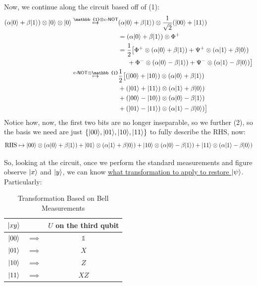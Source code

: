 \documentclass[12pt]{article}
\begin{document}
\noindent Now, we continue along the circuit based off of (1):
\begin{equation}
\begin{aligned}
(\alpha \Ket{0} + \beta \Ket{1})\otimes \Ket{0}\otimes \Ket{0}
    \overset{\mathbb{1}\otimes \text{c-}\NOT}{\mapsto}
    &(\alpha \Ket{0} + \beta \Ket{1})\otimes \frac{1}{\sqrt{2}}(\Ket{00} + \Ket{11})\\
    &=(\alpha \Ket{0} + \beta \Ket{1})\otimes \Phi^+\\
    &= \frac{1}{2}\big[\Phi^+\otimes(\alpha\Ket{0} + \beta\Ket{1}) + \Psi^+\otimes(\alpha\Ket{1} + \beta\Ket{0})\\
    &\hspace{.5cm}+ \Phi^-\otimes(\alpha\Ket{0} - \beta\Ket{1}) + \Psi^-\otimes(\alpha\Ket{1} - \beta\Ket{0})\big]\\
    \overset{\text{c-}\NOT\otimes \mathbb{1}}{\mapsto}
    &\frac{1}{2}\big[(\Ket{00} + \Ket{10})\otimes(\alpha\Ket{0} + \beta\Ket{1})\\
    &+ (\Ket{01} + \Ket{11})\otimes(\alpha\Ket{1} + \beta\Ket{0})\\
    &+ (\Ket{00} - \Ket{10})\otimes(\alpha\Ket{0} - \beta\Ket{1})\\
    &+ (\Ket{01} - \Ket{11})\otimes(\alpha\Ket{1} - \beta\Ket{0})\big]
\end{aligned}
\end{equation}
Notice how, now, the first two bits are no longer inseparable, so we further (2), so the basis we need are just $\{\Ket{00}, \Ket{01}, \Ket{10}, \Ket{11}\}$ to fully describe the RHS, now:
$$
\text{RHS} \mapsto \Ket{00}\otimes (\alpha\Ket{0} + \beta\Ket{1})+\Ket{01}\otimes (\alpha\Ket{1} + \beta\Ket{0}) +\Ket{10}\otimes (\alpha\Ket{0} - \beta\Ket{1}) +\Ket{11}\otimes (\alpha\Ket{1} - \beta\Ket{0})
$$

\noindent So, looking at the circuit, once we perform the standard measurements and figure observe $\Ket{x}$ and $\Ket{y}$, we can know \underline{what transformation to apply to restore $\Ket{\psi}$}. Particularly: 
\begin{table}[]
    \centering
    \begin{tabular}{ccc}
    $\Ket{xy}$  & & $U$ on the third qubit \\
    \hline
    $\Ket{00}$ & $\implies$ & $\mathbb{1}$ \\
    $\Ket{01}$ & $\implies$ & $X$ \\
    $\Ket{10}$ & $\implies$ & $Z$ \\
    $\Ket{11}$ & $\implies$ & $XZ$ \\
\end{tabular}
\caption{Transformation Based on Bell Measurements}
\label{table:how-to-recover-third-qubit}
\end{table}
\end{document}
